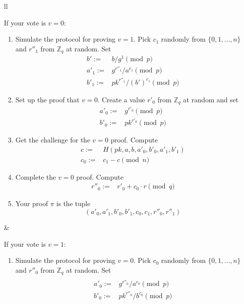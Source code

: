 \documentclass[envcountsame]{llncs}
\begin{document}
\begin{center}
\begin{tabular}{ll}
\begin{minipage}{0.45\textwidth}
If your vote is $v = 0$:

\noindent\begin{enumerate}
\item Simulate the protocol for proving $v = 1$.
Pick $c_1$ randomly from $\{0, 1, \ldots, n\}$ and $r''_1$ from $\mathbb Z_q$ at
random.
Set \[ \begin{array}{rl}
b' := & b/g^1 \pmod{p} \\
a'_1 := & g^{r''_1}/a^{c_1} \pmod{p} \\
b'_1 := & pk^{r''_1}/(b')^{c_1} \pmod{p}
\end{array} \]

\item Set up the proof that $v = 0$.
Create a value $r'_0$ from $\mathbb Z_q$ at random and set
\[ \begin{array}{rl}
a'_0 := & g^{r'_0} \pmod{p} \\
b'_0 := & pk^{r'_0} \pmod{p}
\end{array} \]

\item Get the challenge for the $v = 0$ proof.
Compute
\[ \begin{array}{rl}
c := & H(pk, a, b, a'_0, b'_0, a'_1, b'_1) \\
c_0 := & c_1 - c \pmod{n}
\end{array} \]

\item Complete the $v = 0$ proof.
Compute
\[ \begin{array}{rl}
r''_0 := & r'_0 + c_0 \cdot r \pmod{q}
\end{array} \]

\item Your proof $\pi$ is the tuple
\[
(a'_0, a'_1, b'_0, b'_1, c_0, c_1, r''_0, r''_1)
\]
\end{enumerate}
\end{minipage}
\quad & \quad
\begin{minipage}{0.45\textwidth}
If your vote is $v = 1$:

\begin{enumerate}
\item Simulate the protocol for proving $v = 0$.
Pick $c_0$ randomly from $\{0, 1, \ldots, n\}$ and $r''_0$ from $\mathbb Z_q$ at
random.
Set \[ \begin{array}{rl}
\\
a'_0 := & g^{r''_0}/a^{c_0} \pmod{p} \\
b'_0 := & pk^{r''_0}/b^{c_0} \pmod{p}
\end{array} \]


\end{enumerate}
\end{minipage}
\end{tabular}
\end{center}
\end{document}
